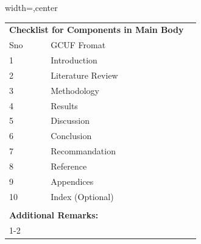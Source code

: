 \begin{table}[!ht]
\footnotesize
\begin{adjustbox}{width=\linewidth,center}
\begin{tabular}{p{0.6cm}p{9cm}p{0.6cm}}
\multicolumn{2}{l}{\textbf{Checklist for Components in Main Body}}                                                               &  \\
Sno            & GCUF Fromat                                                                                                  &  \\
1              & Introduction                                                                                                    &  \\
2              & Literature Review                                                                                               &  \\
3              & Methodology                                                                                                     &  \\
4              & Results                                                                                                         &  \\
5              & Discussion                                                                                                      &  \\
6              & Conclusion                                                                                                      &  \\
7              & Recommandation                                                                                                  &  \\
8              & Reference                                                                                                       &  \\
9              & Appendices                                                                                                      &  \\
10             & Index (Optional)                                                                                                &  \\
               &                                                                                                                 &  \\
\multicolumn{2}{l}{\textbf{Additional Remarks:}}                                                                                 &  \\ \cline{1-2}

\end{tabular}
\end{adjustbox}
\end{table}
